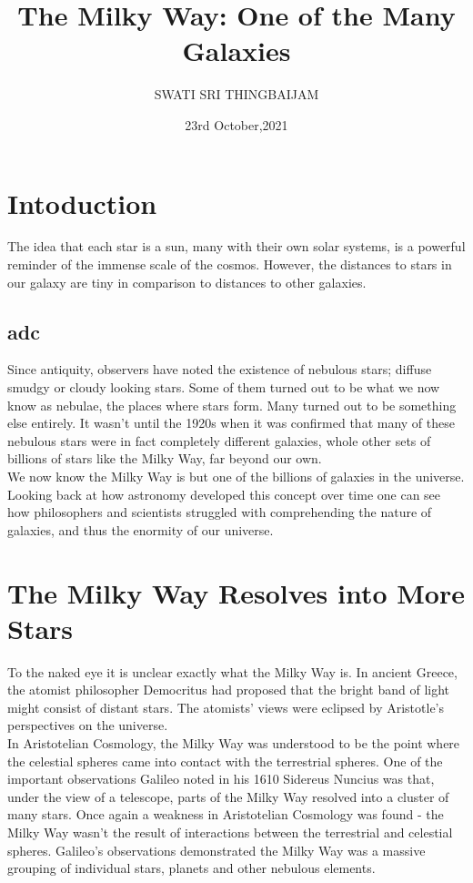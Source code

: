 \documentclass[18pt a4 paper]{article}
\title{\textbf{The Milky Way: One of the Many Galaxies}}
\author{SWATI SRI THINGBAIJAM}
\date{23rd October,2021}
\begin{document}
\maketitle
\section{Intoduction}
The idea that each star is a sun, many with their own solar systems, is a powerful reminder of the immense scale of the cosmos. However, the distances to stars in our galaxy are tiny in comparison to distances to other galaxies.\\ 
\subsection*{adc} 
Since antiquity, observers have noted the existence of nebulous stars; diffuse smudgy or cloudy looking stars. Some of them turned out to be what we now know as nebulae, the places where stars form. Many turned out to be something else entirely. It wasn't until the 1920s when it was confirmed that many of these nebulous stars were in fact completely different galaxies, whole other sets of billions of stars like the Milky Way, far beyond our own. \\ 

We now know the Milky Way is but one of the billions of galaxies in the universe. Looking back at how astronomy developed this concept over time one can see how philosophers and scientists struggled with comprehending the nature of galaxies, and thus the enormity of our universe.
\section{The Milky Way Resolves into More Stars}
To the naked eye it is unclear exactly what the Milky Way is. In ancient Greece, the atomist philosopher Democritus had proposed that the bright band of light might consist of distant stars. The atomists' views were eclipsed by Aristotle's perspectives on the universe.\\ 

In Aristotelian Cosmology, the Milky Way was understood to be the point where the celestial spheres came into contact with the terrestrial spheres. One of the important observations Galileo noted in his 1610 Sidereus Nuncius was that, under the view of a telescope, parts of the Milky Way resolved into a cluster of many stars. Once again a weakness in Aristotelian Cosmology was found - the Milky Way wasn't the result of interactions between the terrestrial and celestial spheres. Galileo's observations demonstrated the Milky Way was a massive grouping of individual stars, planets and other nebulous elements.
\end{document}

